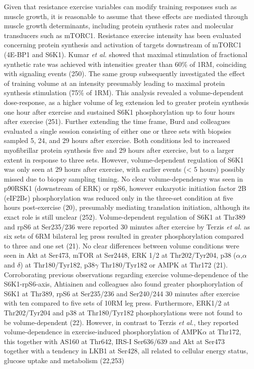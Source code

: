 \documentclass[twoside,10pt]{gihclass} %
\begin{document}
Given that resistance exercise variables can modify training responses such as muscle growth, it is reasonable to assume that these effects are mediated through muscle growth determinants, including protein synthesis rates and molecular transducers such as mTORC1.
Resistance exercise intensity has been evaluated concerning protein synthesis and activation of targets downstream of mTORC1 (4E-BP1 and S6K1).
Kumar \emph{et al.} showed that maximal stimulation of fractional synthetic rate was achieved with intensities greater than 60\% of 1RM, coinciding with signaling events
(250).
The same group subsequently investigated the effect of training volume at an intensity presumably leading to maximal protein synthesis stimulation (75\% of 1RM).
This analysis revealed a volume-dependent dose-response, as a higher volume of leg extension led to greater protein synthesis one hour after exercise and sustained S6K1 phosphorylation up to four hours after exercise
(251).
Further extending the time frame, Burd and colleagues evaluated a single session consisting of either one or three sets with biopsies sampled 5, 24, and 29 hours after exercise. Both conditions led to increased myofibrillar protein synthesis five and 29 hours after exercise, but to a larger extent in response to three sets.
However, volume-dependent regulation of S6K1 was only seen at 29 hours after exercise, with earlier events (\textless{} 5 hours) possibly missed due to biopsy sampling timing.
No clear volume-dependency was seen in p90RSK1 (downstream of ERK) or rpS6, however eukaryotic initiation factor 2B (eIF2B\(\epsilon\)) phosphorylation was reduced only in the three-set condition at five hours post-exercise (20), presumably mediating translation initiation, although its exact role is still unclear
(252).
Volume-dependent regulation of S6K1 at Thr389 and rpS6 at Ser235/236 were reported 30 minutes after exercise by Terzis \emph{et al.} as six sets of 6RM bilateral leg press resulted in greater phosphorylation compared to three and one set
(21).
No clear differences between volume conditions were seen in Akt at Ser473, mTOR at Ser2448, ERK 1/2 at Thr202/Tyr204, p38 (\(\alpha\),\(\alpha\) and \(\delta\)) at Thr180/Tyr182, p38\(\gamma\) Thr180/Tyr182 or AMPK at Thr172
(21).
Corroborating previous observations regarding exercise volume-dependence of the S6K1-rpS6-axis, Ahtiainen and colleagues also found greater phosphorylation of S6K1 at Thr389, rpS6 at Ser235/236 and Ser240/244 30 minutes after exercise with ten compared to five sets of 10RM leg press.
Furthermore, ERK1/2 at Thr202/Tyr204 and p38 at Thr180/Tyr182 phosphorylations were not found to be volume-dependent
(22).
However, in contrast to Terzis \emph{et al.}, they reported volume-dependence in exercise-induced phosphorylation of AMPK\(\alpha\) at Thr172, this together with AS160 at Thr642, IRS-I Ser636/639 and Akt at Ser473 together with a tendency in LKB1 at Ser428, all related to cellular energy status, glucose uptake and metabolism
(22,253)
\end{document}

